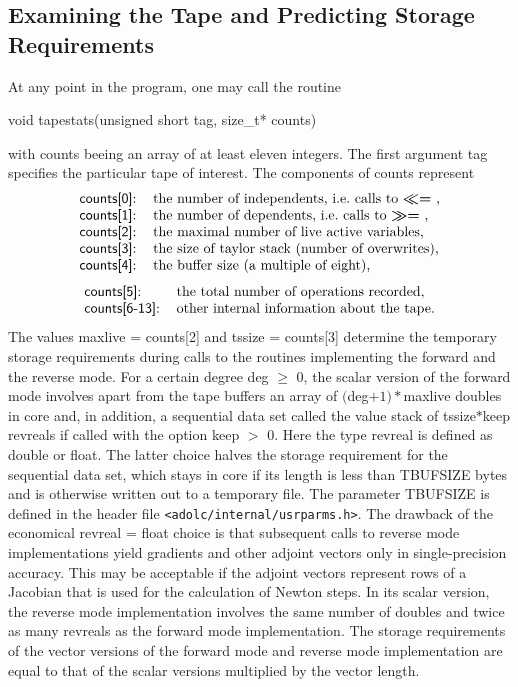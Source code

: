 \documentclass[11pt,twoside]{article}
\begin{document}
\subsection{Examining the Tape and Predicting Storage Requirements }
\label{examiningTape}
%
At any point in the program, one may call the routine
\begin{center}
{\sf void tapestats(unsigned short tag, size\_t* counts)}
\end{center}
with {\sf counts} beeing an array of at least eleven integers.
The first argument {\sf tag} specifies the particular tape of
interest. The components of {\sf counts} represent
\[
\begin{tabular}{ll}
{\sf counts[0]}: & the number of independents, i.e.~calls to \boldmath $\ll=$ \unboldmath, \\
{\sf counts[1]}: & the number of dependents, i.e.~calls to \boldmath $\gg=$ \unboldmath,\\ 
{\sf counts[2]}: & the maximal number of live active variables,\\
{\sf counts[3]}: & the size of taylor stack (number of overwrites),\\
{\sf counts[4]}: & the buffer size (a multiple of eight),
\end{tabular}
\]
\[
\begin{tabular}{ll}
{\sf counts[5]}: & the total number of operations recorded,\\
{\sf counts[6-13]}: & other internal information about the tape.
\end{tabular}
\]
The values {\sf maxlive} = {\sf counts[2]} and {\sf tssize} = {\sf counts[3]} 
determine the temporary 
storage requirements during calls to the routines
implementing the forward and the reverse mode.
For a certain degree {\sf deg} $\geq$ 0, the scalar version of the
forward mode involves apart from the tape buffers an array of 
 $(${\sf deg}$+1)*${\sf maxlive} {\sf double}s in
core and, in addition, a sequential data set called the value stack 
of {\sf tssize}$*${\sf keep} {\sf revreal}s if called with the 
option {\sf keep} $>$ 0. Here
the type {\sf revreal} is defined as {\sf double} or {\sf float}. The latter choice halves the storage
requirement for the sequential data set, which stays in core if
its length is less than {\sf TBUFSIZE} bytes and is otherwise written
out to a temporary file. The parameter {\sf TBUFSIZE} is defined in the header file \verb=<adolc/internal/usrparms.h>=.
The drawback of the economical 
{\sf revreal} = {\sf float} choice is that subsequent calls to reverse mode implementations
yield gradients and other adjoint vectors only in single-precision
accuracy. This may be acceptable if the adjoint vectors
represent rows of a Jacobian that is  used for the calculation of
Newton steps. In its scalar version, the reverse mode implementation involves 
the same number of {\sf double}s and twice as many {\sf revreal}s as the
forward mode implementation.
The storage requirements of the vector versions of the forward mode and
reverse mode implementation are equal to that of the scalar versions multiplied by
the vector length.
%
\end{document}
